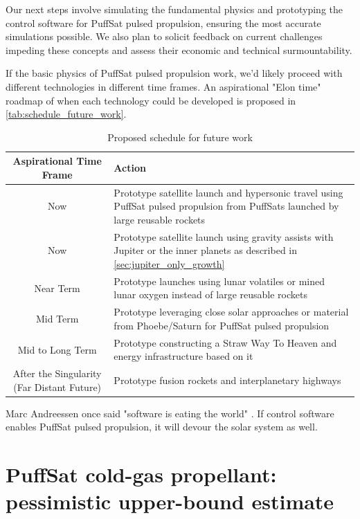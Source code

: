 \documentclass{article}
\begin{document}
Our next steps involve simulating the fundamental physics and prototyping the control software for PuffSat pulsed propulsion, ensuring the most accurate simulations possible. We also plan to solicit feedback on current challenges impeding these concepts and assess their economic and technical surmountability.

If the basic physics of PuffSat pulsed propulsion work, we'd likely proceed with different technologies in different time frames.  An aspirational "Elon time" \cite{wiktionary_elon_time} roadmap of when each technology could be  developed is proposed in \autoref{tab:schedule_future_work}.


\begin{table}[htpb]
    \centering
    \begin{tabularx}{\textwidth}{|c|L|}\hline
        \textbf{Aspirational Time Frame} & \textbf{Action} \\\hline
        Now & Prototype satellite launch and hypersonic travel using PuffSat pulsed propulsion from PuffSats launched by large reusable rockets\\\hline
        Now & Prototype satellite launch using gravity assists with Jupiter or the inner planets as described in \autoref{sec:jupiter_only_growth} \\\hline
        Near Term & Prototype launches using lunar volatiles or mined lunar oxygen instead of large reusable rockets \\\hline
        Mid Term & Prototype leveraging close solar approaches or material from Phoebe/Saturn for PuffSat  pulsed propulsion \\\hline
        Mid to Long Term & Prototype constructing a Straw Way To Heaven and energy infrastructure based on it \\\hline
        After the Singularity (Far Distant Future) & Prototype fusion rockets and interplanetary highways \\\hline
    \end{tabularx}
    \caption{Proposed schedule for future work}
    \label{tab:schedule_future_work}
\end{table}

Marc Andreessen once said "software is eating the world" \cite{andreessen_software}.   If control software enables PuffSat pulsed propulsion, it will devour the solar system as well.

\appendix 

\section{PuffSat cold-gas propellant: pessimistic upper-bound estimate}\label{sec:estimate_cold_gas}
\end{document}
